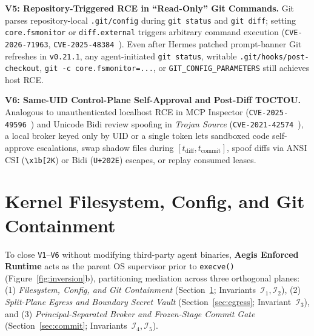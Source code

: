 \documentclass[10pt,journal,compsoc]{IEEEtran}
\begin{document}
\noindent\textbf{V5: Repository-Triggered RCE in ``Read-Only'' Git Commands.}
Git parses repository-local \texttt{.git/config} during \texttt{git status} and \texttt{git diff}; setting \texttt{core.fsmonitor} or \texttt{diff.external} triggers arbitrary command execution (\texttt{CVE-2026-71963}, \texttt{CVE-2025-48384}~\cite{nvd2026fsmonitor}). Even after Hermes patched prompt-banner Git refreshes in \texttt{v0.21.1}, any agent-initiated \texttt{git status}, writable \texttt{.git/hooks/post-checkout}, \texttt{git -c core.fsmonitor=...}, or \texttt{GIT\_CONFIG\_PARAMETERS} still achieves host RCE.

\noindent\textbf{V6: Same-UID Control-Plane Self-Approval and Post-Diff TOCTOU.}
Analogous to unauthenticated localhost RCE in MCP Inspector (\texttt{CVE-2025-49596}~\cite{nvd2025mcpremote}) and Unicode Bidi review spoofing in \emph{Trojan Source} (\texttt{CVE-2021-42574}~\cite{boucher2023trojan}), a local broker keyed only by UID or a single token lets sandboxed code self-approve escalations, swap shadow files during $[t_{\text{diff}}, t_{\text{commit}}]$, spoof diffs via ANSI CSI (\texttt{\textbackslash x1b[2K}) or Bidi (\texttt{U+202E}) escapes, or replay consumed leases.

\section{Kernel Filesystem, Config, and Git Containment}
\label{sec:launcher}

To close \texttt{V1}--\texttt{V6} without modifying third-party agent binaries, \textbf{Aegis Enforced Runtime} acts as the parent OS supervisor prior to \texttt{execve()} (Figure~\ref{fig:inversion}b), partitioning mediation across three orthogonal planes: (1) \emph{Filesystem, Config, and Git Containment} (Section~\ref{sec:launcher}; Invariants~$\mathcal{I}_1, \mathcal{I}_2$), (2) \emph{Split-Plane Egress and Boundary Secret Vault} (Section~\ref{sec:egress}; Invariant~$\mathcal{I}_3$), and (3) \emph{Principal-Separated Broker and Frozen-Stage Commit Gate} (Section~\ref{sec:commit}; Invariants~$\mathcal{I}_4, \mathcal{I}_5$).
\end{document}
